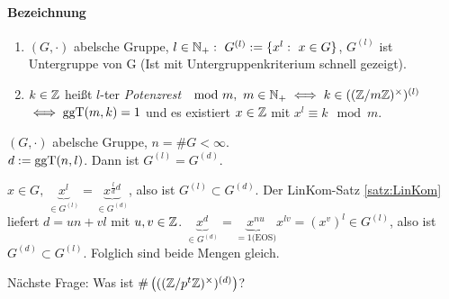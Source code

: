 \documentclass[a4paper,twoside,DIV15,BCOR12mm]{scrbook}
\begin{document}
\paragraph{Bezeichnung}
\begin{enumerate}
    \item $(G,\cdot)$ abelsche Gruppe, $l\in\MdN_+:\ G^{(l)}:=\{x^l:\ x\in
    G\}$, $G^{(l)}$ ist Untergruppe von G (Ist mit
    Untergruppenkriterium schnell gezeigt).
    \item $k\in \mathbb{Z}$ heißt $l$-ter \emph{Potenzrest} $\mod m,\ m\in
    \mathbb{N}_+ \iff k\in((\mathbb{Z} / m \mathbb{Z})^{\times})^{(l)}$ $\iff
    \mathop{\rm ggT}\nolimits(m,k)=1$ und es existiert $x\in \mathbb{Z}$ mit $x^l \equiv k \mod
    m$.
\end{enumerate}
\begin{lemma}
    $(G,\cdot)$ abelsche Gruppe, $n=\#G<\infty$.\\
    $d:=\mathop{\rm ggT}\nolimits(n,l)$. Dann ist $G^{(l)}=G^{(d)}$.
\end{lemma}
\begin{beweis}
    $x\in G,\ \underbrace{x^l}_{\in
    G^{(l)}}=\underbrace{x^{\frac{l}{d}d}}_{\in G^{(d)}}$, also ist
    $G^{(l)} \subset G^{(d)}$. Der LinKom-Satz
    \ref{satz:LinKom} liefert $d=un+vl$ mit $u,v\in\mathbb{Z}$.
    $\underbrace{x^d}_{\in G^{(d)}}=\underbrace{x^{nu}}_{=1
    \text{(EOS)}} x^{lv}=(x^v)^l \in G^{(l)}$, also ist
    $G^{(d)}\subset G^{(l)}$. Folglich sind beide Mengen gleich.
\end{beweis}
Nächste Frage: Was ist $\#\left( ((\mathbb{Z}/p^t\mathbb{Z})^{\times})^{(d)}
\right)$?\\
\end{document}
